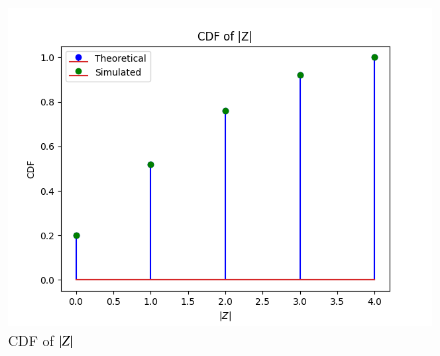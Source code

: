 \documentclass[journal,12pt,onecolumn]{IEEEtran}
\theoremstyle{remark}
\begin{document}
\begin{figure}[!ht]
\centering
\includegraphics[width=\columnwidth]{./figs/figure3.png}
\caption{CDF of $\left\vert Z\right\vert$}
\end{figure}
\\
\end{document}
